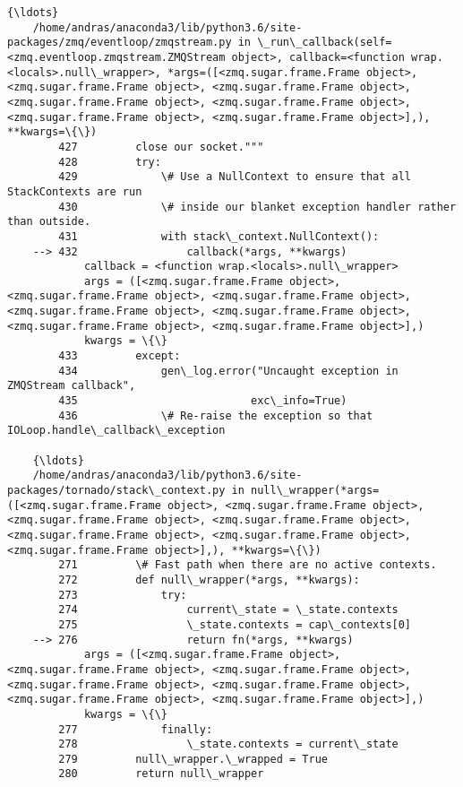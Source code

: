 \documentclass[11pt]{article}
\begin{document}
\begin{Verbatim}[commandchars=\\\{\}]
    {\ldots}
    /home/andras/anaconda3/lib/python3.6/site-packages/zmq/eventloop/zmqstream.py in \_run\_callback(self=<zmq.eventloop.zmqstream.ZMQStream object>, callback=<function wrap.<locals>.null\_wrapper>, *args=([<zmq.sugar.frame.Frame object>, <zmq.sugar.frame.Frame object>, <zmq.sugar.frame.Frame object>, <zmq.sugar.frame.Frame object>, <zmq.sugar.frame.Frame object>, <zmq.sugar.frame.Frame object>, <zmq.sugar.frame.Frame object>],), **kwargs=\{\})
        427         close our socket."""
        428         try:
        429             \# Use a NullContext to ensure that all StackContexts are run
        430             \# inside our blanket exception handler rather than outside.
        431             with stack\_context.NullContext():
    --> 432                 callback(*args, **kwargs)
            callback = <function wrap.<locals>.null\_wrapper>
            args = ([<zmq.sugar.frame.Frame object>, <zmq.sugar.frame.Frame object>, <zmq.sugar.frame.Frame object>, <zmq.sugar.frame.Frame object>, <zmq.sugar.frame.Frame object>, <zmq.sugar.frame.Frame object>, <zmq.sugar.frame.Frame object>],)
            kwargs = \{\}
        433         except:
        434             gen\_log.error("Uncaught exception in ZMQStream callback",
        435                           exc\_info=True)
        436             \# Re-raise the exception so that IOLoop.handle\_callback\_exception
    
    {\ldots}
    /home/andras/anaconda3/lib/python3.6/site-packages/tornado/stack\_context.py in null\_wrapper(*args=([<zmq.sugar.frame.Frame object>, <zmq.sugar.frame.Frame object>, <zmq.sugar.frame.Frame object>, <zmq.sugar.frame.Frame object>, <zmq.sugar.frame.Frame object>, <zmq.sugar.frame.Frame object>, <zmq.sugar.frame.Frame object>],), **kwargs=\{\})
        271         \# Fast path when there are no active contexts.
        272         def null\_wrapper(*args, **kwargs):
        273             try:
        274                 current\_state = \_state.contexts
        275                 \_state.contexts = cap\_contexts[0]
    --> 276                 return fn(*args, **kwargs)
            args = ([<zmq.sugar.frame.Frame object>, <zmq.sugar.frame.Frame object>, <zmq.sugar.frame.Frame object>, <zmq.sugar.frame.Frame object>, <zmq.sugar.frame.Frame object>, <zmq.sugar.frame.Frame object>, <zmq.sugar.frame.Frame object>],)
            kwargs = \{\}
        277             finally:
        278                 \_state.contexts = current\_state
        279         null\_wrapper.\_wrapped = True
        280         return null\_wrapper
    

\end{Verbatim}
\end{document}
